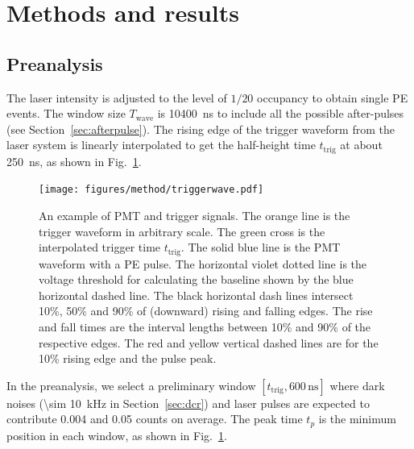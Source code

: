 \section{Methods and results}
\label{Method}
\subsection{Preanalysis}
\label{sec:laserstage}

The laser intensity is adjusted to the level of $1/20$ occupancy to obtain single PE events. The window size $T_{\mathrm{wave}}$ is \SI{10400}{ns} to include all the possible after-pulses (see Section~\ref{sec:afterpulse}). The rising edge of the trigger waveform from the laser system is linearly interpolated to get the half-height time $t_{\mathrm{trig}}$ at about \SI{250}{ns}, as shown in Fig.~\ref{fig:triggertime}.
\begin{figure}[!htbp]
    \centering
    \texttt{[image: figures/method/triggerwave.pdf]}
    \caption{An example of PMT and trigger signals. The orange line is the trigger waveform in arbitrary scale. The green cross is the interpolated trigger time $t_{\mathrm{trig}}$. The solid blue line is the PMT waveform with a PE pulse. The horizontal violet dotted line is the voltage threshold for calculating the baseline shown by the blue horizontal dashed line. The black horizontal dash lines intersect 10\%, 50\% and 90\% of (downward) rising and falling edges. The rise and fall times are the interval lengths between 10\% and 90\% of the respective edges. The red and yellow vertical dashed lines are for the 10\% rising edge and the pulse peak.}
    \label{fig:triggertime}
\end{figure}


In the preanalysis, we select a preliminary window $[t_{\mathrm{trig}},600\,\mathrm{ns}]$ where dark noises (\SI{\sim 10}{kHz} in Section~\ref{sec:dcr}) and laser pulses are expected to contribute 0.004 and 0.05 counts on average. The peak time $t_p$ is the minimum position in each window, as shown in Fig.~\ref{fig:triggertime}.


